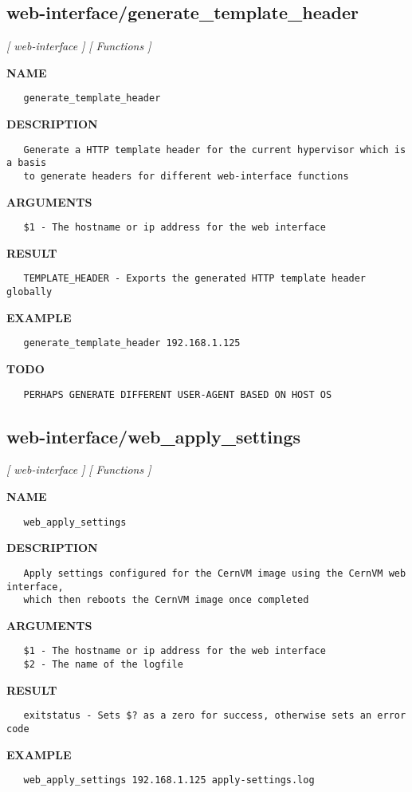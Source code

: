 \subsection{web-interface/generate\_template\_header}
\textsl{[ web-interface ]}
\textsl{[ Functions ]}

\label{ch:robo44}
\label{ch:web_interface_generate_template_header}
\textbf{NAME}
\begin{verbatim}
   generate_template_header
\end{verbatim}
\textbf{DESCRIPTION}
\begin{verbatim}
   Generate a HTTP template header for the current hypervisor which is a basis
   to generate headers for different web-interface functions
\end{verbatim}
\textbf{ARGUMENTS}
\begin{verbatim}
   $1 - The hostname or ip address for the web interface
\end{verbatim}
\textbf{RESULT}
\begin{verbatim}
   TEMPLATE_HEADER - Exports the generated HTTP template header globally
\end{verbatim}
\textbf{EXAMPLE}
\begin{verbatim}
   generate_template_header 192.168.1.125
\end{verbatim}
\textbf{TODO}
\begin{verbatim}
   PERHAPS GENERATE DIFFERENT USER-AGENT BASED ON HOST OS
\end{verbatim}
\newpage
\subsection{web-interface/web\_apply\_settings}
\textsl{[ web-interface ]}
\textsl{[ Functions ]}

\label{ch:robo45}
\label{ch:web_interface_web_apply_settings}
\textbf{NAME}
\begin{verbatim}
   web_apply_settings
\end{verbatim}
\textbf{DESCRIPTION}
\begin{verbatim}
   Apply settings configured for the CernVM image using the CernVM web interface, 
   which then reboots the CernVM image once completed
\end{verbatim}
\textbf{ARGUMENTS}
\begin{verbatim}
   $1 - The hostname or ip address for the web interface
   $2 - The name of the logfile
\end{verbatim}
\textbf{RESULT}
\begin{verbatim}
   exitstatus - Sets $? as a zero for success, otherwise sets an error code
\end{verbatim}
\textbf{EXAMPLE}
\begin{verbatim}
   web_apply_settings 192.168.1.125 apply-settings.log
\end{verbatim}
\newpage
